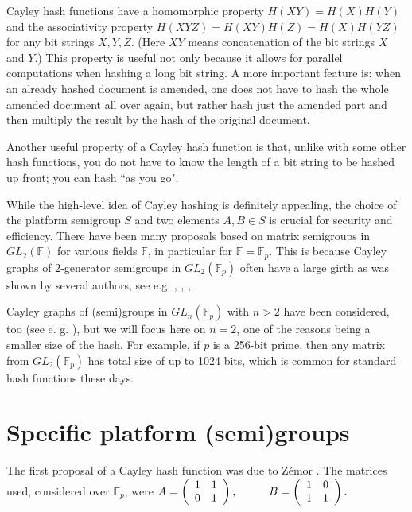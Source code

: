\documentclass{lmsedition}
\newcommand{\F}{\mathbb{F}}
\begin{document}
\begin{twoblock}
Cayley hash functions have a homomorphic property $H(XY)=H(X)H(Y)$ and the
associativity property $H(XYZ)=H(XY)H(Z) = H(X)H(YZ)$ for any bit
strings $X, Y, Z$. (Here $XY$ means concatenation of the bit strings $X$
and $Y$.) This property is useful not only because it allows for parallel computations  when hashing a long bit string. A more important feature is: when an already hashed document is amended, one does not have to hash the whole amended document all over again, but rather hash just the amended part and then multiply the result by the hash of the original document. 
 
Another useful property of a Cayley hash function is that, unlike with some other hash functions, you do not have to know the length of a bit string to be hashed up front; you can hash ``as you go".

While the high-level idea of Cayley hashing is definitely appealing, the choice of the platform semigroup $S$ and two elements $A, B \in S$ is crucial for security and efficiency. There have been many proposals based on matrix semigroups in $GL_2(\F)$ for various fields $\F$, in particular for $\F=\F_p$. This is because Cayley graphs of 2-generator semigroups in $GL_2(\F_p)$ often have a large girth as was shown by several authors, see e.g. \cite{BG}, \cite{BSV}, \cite{Masuda}, \cite{H}. %

Cayley graphs of (semi)groups in $GL_n(\F_p)$ with $n >2$ have been considered, too (see e. g.  \cite{Battarbee}), but we will focus here on $n =2$, one of the reasons being a smaller size of the hash. For example, if $p$ is a 256-bit prime, then any matrix from $GL_2(\F_p)$ has total  size of up to 1024 bits, which is common for standard hash functions these days.


 
\section*{Specific platform (semi)groups}\label{previous}

The first proposal of a Cayley hash function was due to Z\'emor \cite{Zemor}.
The matrices used, considered over $\F_p$, were %
$A = \left(
 \begin{array}{cc} 1 & 1 \\ 0 & 1 \end{array} \right) , \hskip 1cm B = \left(
 \begin{array}{cc} 1 & 0 \\ 1 & 1 \end{array} \right).$


\end{twoblock}
\end{document}
